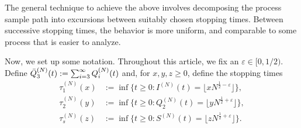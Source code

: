 \documentclass[11pt, reqno]{article}
\numberwithin{equation}{section}
\numberwithin{theorem}{section}
\begin{document}
The general technique to achieve the above involves decomposing the process sample path into excursions between suitably chosen stopping times. Between successive stopping times, the behavior is more uniform, and comparable to some process that is easier to analyze.


Now, we set up some notation. Throughout this article, we fix an $\varepsilon \in [0,1/2)$. Define $\Bar{Q}^{(N)}_3(t):=\sum_{i=3}^{\infty}Q^{(N)}_i(t)$
and, for $x, y, z \geq 0$, define the stopping times
\begin{equation}\label{eq:tau-def}
    \begin{split}
        \tau^{(N)}_1(x)&:=\inf\big\{t\geq 0:I^{(N)}(t)= \lfloor xN^{\frac{1}{2}-\varepsilon} \rfloor \big\},\\
    \tau^{(N)}_2(y)&:=\inf\big\{t\geq 0:Q^{(N)}_2(t)= \lfloor yN^{\frac{1}{2}+\varepsilon} \rfloor\big\},\\
    \tau^{(N)}_s(z)&:=\inf \big\{t\geq 0:S^{(N)}(t)= \lfloor zN^{\frac{1}{2}+\varepsilon}\rfloor\big\}.
    \end{split}
\end{equation}
\end{document}
